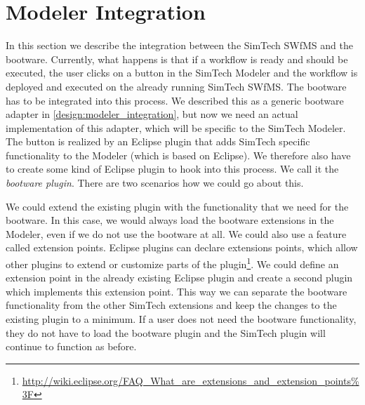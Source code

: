 \section{Modeler Integration}
\label{implementation:modeler_integration}

In this section we describe the integration between the SimTech SWfMS and the bootware.
Currently, what happens is that if a workflow is ready and should be executed, the user clicks on a button in the SimTech Modeler and the workflow is deployed and executed on the already running SimTech SWfMS.
The bootware has to be integrated into this process.
We described this as a generic bootware adapter in \autoref{design:modeler_integration}, but now we need an actual implementation of this adapter, which will be specific to the SimTech Modeler.
The button is realized by an Eclipse plugin that adds SimTech specific functionality to the Modeler (which is based on Eclipse).
We therefore also have to create some kind of Eclipse plugin to hook into this process.
We call it the \textit{bootware plugin}.
There are two scenarios how we could go about this.

We could extend the existing plugin with the functionality that we need for the bootware.
In this case, we would always load the bootware extensions in the Modeler, even if we do not use the bootware at all.
We could also use a feature called extension points.
Eclipse plugins can declare extensions points, which allow other plugins to extend or customize parts of the plugin\footnote{\url{http://wiki.eclipse.org/FAQ_What_are_extensions_and_extension_points\%3F}}.
We could define an extension point in the already existing Eclipse plugin and create a second plugin which implements this extension point.
This way we can separate the bootware functionality from the other SimTech extensions and keep the changes to the existing plugin to a minimum.
If a user does not need the bootware functionality, they do not have to load the bootware plugin and the SimTech plugin will continue to function as before.

\vspace*{\baselineskip}

